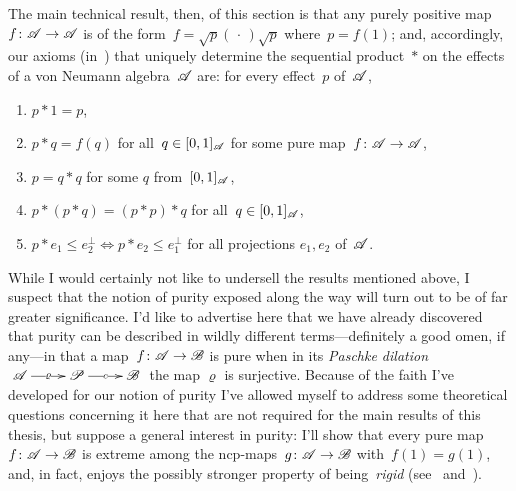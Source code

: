 \documentclass[a]{subfiles}
\begin{document}
\begin{parsec}
\begin{point}
The main technical result, then, of this section
is that any purely positive map $f\colon\mathscr{A}\to\mathscr{A}$
is of the form~$f=\sqrt{p}(\,\cdot\,)\sqrt{p}$
where~$p=f(1)$;
and, accordingly, our axioms 
(in~)
that uniquely
determine the sequential product~$\ast$
on the effects of a von Neumann algebra~$\mathscr{A}$ are:
for every effect~$p$ of~$\mathscr{A}$,
\begin{enumerate}
\item
$p\ast 1=p$,
\item
$p\ast q = f(q)$
for all~$q\in [0,1]_{\mathscr{A}}$
for some pure map~$f\colon \mathscr{A}\to\mathscr{A}$,
\item
$p=q\ast q$ for some $q$ from~$[0,1]_{\mathscr{A}}$,
\item
$p \ast (p \ast q) = (p\ast p)\ast q$
for all~$q\in[0,1]_{\mathscr{A}}$,
\item
$p \ast e_1 \leq e_2^\perp\iff
p \ast e_2 \leq e_1^\perp$
for all projections $e_1,e_2$ of~$\mathscr{A}$.
\end{enumerate}%
While I would certainly not like
to undersell the results mentioned above,
I suspect that the notion of purity exposed along the way
will turn out to be of far greater significance.
I'd like to advertise
here that we have already discovered that purity can be described in
wildly different terms---definitely a good omen, if any---in
that a map~$f\colon \mathscr{A}\to\mathscr{B}$ is pure when in its 
\emph{Paschke dilation} 
$\xymatrix{\scrA
	\ar[r]|-\varrho
&
	\scrP\ar[r]|-c
&
\scrB}$
the map $\varrho$ is surjective.
Because of the faith I've developed for our notion of purity I've allowed myself
to address some theoretical questions concerning it
here that are not required for the main results of this thesis,
but suppose a general interest in purity:
I'll show that every pure map~$f\colon\mathscr{A}\to\mathscr{B}$
is extreme among the ncp-maps~$g\colon \mathscr{A}\to\mathscr{B}$ with~$f(1)=g(1)$,
and, in fact, enjoys the possibly stronger property 
of being~\emph{rigid} (see~ and~).
\end{point}
\end{parsec}
\end{document}
